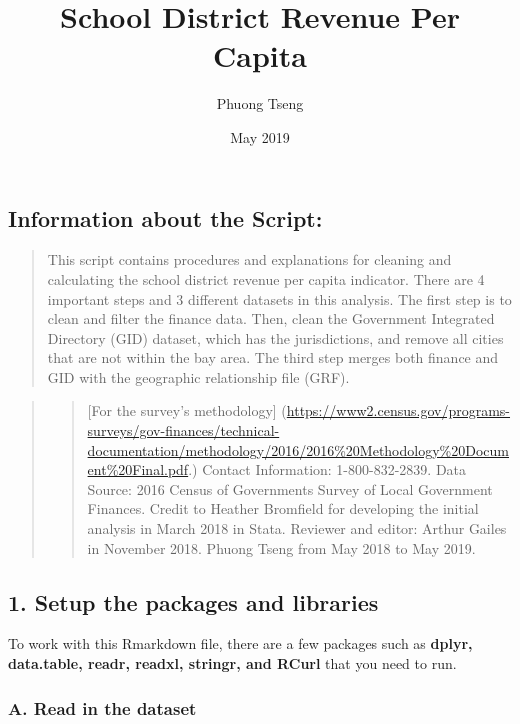 \documentclass[]{article}
\title{School District Revenue Per Capita}
\author{Phuong Tseng}
\date{May 2019}
\begin{document}
\maketitle

{
\setcounter{tocdepth}{2}
\tableofcontents
}
\subsection{Information about the
Script:}\label{information-about-the-script}

\begin{quote}
This script contains procedures and explanations for cleaning and
calculating the school district revenue per capita indicator. There are
4 important steps and 3 different datasets in this analysis. The first
step is to clean and filter the finance data. Then, clean the Government
Integrated Directory (GID) dataset, which has the jurisdictions, and
remove all cities that are not within the bay area. The third step
merges both finance and GID with the geographic relationship file (GRF).
\end{quote}

\begin{quote}
\begin{quote}
{[}For the survey's methodology{]}
(\url{https://www2.census.gov/programs-surveys/gov-finances/technical-documentation/methodology/2016/2016\%20Methodology\%20Document\%20Final.pdf}.)
Contact Information: 1-800-832-2839. Data Source: 2016 Census of
Governments Survey of Local Government Finances. Credit to Heather
Bromfield for developing the initial analysis in March 2018 in Stata.
Reviewer and editor: Arthur Gailes in November 2018. Phuong Tseng from
May 2018 to May 2019.
\end{quote}
\end{quote}

\subsection{1. Setup the packages and
libraries}\label{setup-the-packages-and-libraries}

To work with this Rmarkdown file, there are a few packages such as
\textbf{dplyr, data.table, readr, readxl, stringr, and RCurl} that you
need to run.

\subsubsection{A. Read in the dataset}\label{a.-read-in-the-dataset}
\end{document}
